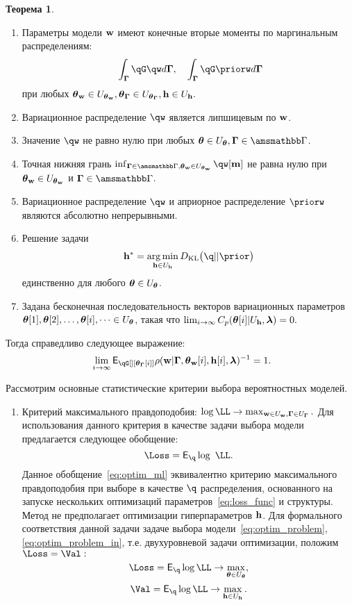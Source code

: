 \documentclass[11pt, a5paper]{dissert}
\theoremstyle{definition}
\newtheorem{theorem}{Теорема}
\DeclareMathOperator*{\argmin}{arg\,min}
\begin{document}
{\begin{theorem}
\begin{enumerate}
\item Параметры модели $\mathbf{w}$ имеют конечные вторые моменты по маргинальным распределениям:
\[
   \int_{\G}\qG\qw d\G, \quad \int_{\G}\qG\priorw d\G
\]
при любых $\boldsymbol{\theta}_\mathbf{w} \in U_{\boldsymbol{\theta}_\mathbf{w}}, \boldsymbol{\theta}_{\boldsymbol{\Gamma}} \in U_{\boldsymbol{\theta}_{\boldsymbol{\Gamma}}}, \mathbf{h} \in U_{\mathbf{h}}.$


\item Вариационное распределение $\qw$ является липшицевым по $\mathbf{w}$.

\item Значение $\qw$ не равно нулю при любых $\teta \in \Uteta, \G \in \Gb$.

\item Точная нижняя грань $\inf_{\G \in \Gb, \tetaw \in \Utetaw} \qw[\mathbf{m}]$ не равна нулю при $\boldsymbol{\theta}_\mathbf{w} \in U_{\boldsymbol{\theta}_\mathbf{w}}$ и $\G \in \Gb$.

\item Вариационное распределение $\qw$ и априорное распределение $\priorw$  являются абсолютно непрерывными.

\item Решение задачи 
\begin{equation}
\label{eq:dkl_solve}
\h^{*} = \argmin_{\h \in \Uh} \KL{\q}{\prior}
\end{equation} единственно для любого $\boldsymbol{\theta} \in U_{\boldsymbol{\theta}}$.



\item Задана  бесконечная последовательность векторов вариационных параметров $\boldsymbol{\theta}[1],\boldsymbol{\theta}[2],\dots,\boldsymbol{\theta}[i],\dots \in U_{\boldsymbol{\theta}}$, такая что $\lim_{i \to \infty}C_p(\boldsymbol{\theta}[i]|U_{\mathbf{h}},\boldsymbol{\lambda}) = 0.$
\end{enumerate}
Тогда справедливо следующее выражение:
\[
   \lim_{i \to \infty} \E_{\qG[][{\tetaG[i]}]} {\rho}(\w|\G, {\tetaw[i]}, {\h[i]}, \lam)^{-1} = 1.
\]

\end{theorem}

Рассмотрим основные статистические критерии выбора вероятностных моделей. 
\begin{enumerate}
\item Критерий максимального правдоподобия:
$\log \LL \to \max_{\w \in \Uw, \G \in \UG}.$
Для использования данного критерия в качестве задачи выбора модели предлагается следующее обобщение:
\begin{equation}
\label{eq:optim_ml}
    \Loss =  \E_{\q} \log~\LL.
\end{equation}
Данное обобщение~\eqref{eq:optim_ml} эквивалентно  критерию максимального правдоподобия при выборе в качестве $\q$ распределения, основанного на запуске нескольких  оптимизаций параметров~\eqref{eq:loss_func} и структуры.
Метод не предполагает оптимизации гиперпараметров $\mathbf{h}$. Для формального соответствия данной задачи задаче выбора модели~\eqref{eq:optim_problem},\eqref{eq:optim_problem_in}, т.е. двухуровневой задачи оптимизации, положим $\Loss=\Val:$
\[
    \Loss =  \E_{\q}\log \LL \to \max_{\teta \in \Uteta},
\]
\[
    \Val =  \E_{\q}\log \LL \to \max_{\h \in \Uh}.
\]




\end{enumerate}}
\end{document}
